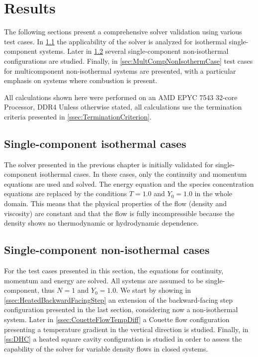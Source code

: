 \chapter{Results}	\label{ch:results}
\glsresetall
The following sections present a comprehensive solver validation using various test cases. In \cref{sec:SingleCompIsotCase} the applicability of the solver is analyzed for isothermal single-component systems. Later in \cref{sec:SinCompNonIsothermCase} several single-component non-isothermal configurations are studied. Finally, in \cref{sec:MultCompNonIsothermCase} test cases for multicomponent non-isothermal systems are presented, with a particular emphasis on systems where combustion is present.

All calculations shown here were performed on an AMD EPYC 7543 32-core Processor, DDR4 %
Unless otherwise stated, all calculations use the termination criteria presented in \cref{ssec:TerminationCriterion}.
\section{Single-component isothermal cases}\label{sec:SingleCompIsotCase}
The solver presented in the previous chapter is initially validated for single-component isothermal cases. In these cases, only the continuity and momentum equations are used and solved. The energy equation and the species concentration equations are replaced by the conditions $T = 1.0$ and $Y_0 = 1.0$ in the whole domain. This means that the physical properties of the flow (density and viscosity) are constant and that the flow is fully incompressible because the density shows no thermodynamic or hydrodynamic dependence.


\section{Single-component non-isothermal cases} \label{sec:SinCompNonIsothermCase}
For the test cases presented in this section, the equations for continuity, momentum and energy are solved. All systems are assumed to be single-component, thus $N = 1$ and $Y_0 = 1.0$. We start by showing in \cref{ssec:HeatedBackwardFacingStep} an extension of the backward-facing step configuration presented in the last section, considering now a non-isothermal system. Later in \cref{ssec:CouetteFlowTempDiff} a Couette flow configuration presenting a temperature gradient in the vertical direction is studied. Finally, in \cref{ss:DHC} a heated square cavity configuration is studied in order to assess the capability of the solver for variable density flows in closed systems.



